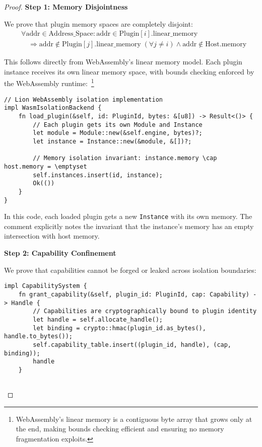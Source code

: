 \begin{proof}

\textbf{Step 1: Memory Disjointness}

We prove that plugin memory spaces are completely disjoint:
\begin{align}
&\forall \text{addr} \in \text{Address\_Space}: \text{addr} \in \text{Plugin}[i].\text{linear\_memory} \nonumber \\
&\quad \Rightarrow \text{addr} \notin \text{Plugin}[j].\text{linear\_memory} \; (\forall j \neq i) \land \text{addr} \notin \text{Host}.\text{memory}
\end{align}

This follows directly from WebAssembly's linear memory model. Each plugin instance receives its own linear memory space, with bounds checking enforced by the WebAssembly runtime:~\footnote{WebAssembly's linear memory is a contiguous byte array that grows only at the end, making bounds checking efficient and ensuring no memory fragmentation exploits.}

\begin{lstlisting}[style=rust,caption={Lion WebAssembly isolation implementation}]
// Lion WebAssembly isolation implementation
impl WasmIsolationBackend {
    fn load_plugin(&self, id: PluginId, bytes: &[u8]) -> Result<()> {
        // Each plugin gets its own Module and Instance
        let module = Module::new(&self.engine, bytes)?;
        let instance = Instance::new(&module, &[])?;
        
        // Memory isolation invariant: instance.memory \cap host.memory = \emptyset
        self.instances.insert(id, instance);
        Ok(())
    }
}
\end{lstlisting}

In this code, each loaded plugin gets a new \texttt{Instance} with its own memory. The comment explicitly notes the invariant that the instance's memory has an empty intersection with host memory.

\textbf{Step 2: Capability Confinement}

We prove that capabilities cannot be forged or leaked across isolation boundaries:

\begin{lstlisting}[style=rust,caption={Capability system implementation}]
impl CapabilitySystem {
    fn grant_capability(&self, plugin_id: PluginId, cap: Capability) -> Handle {
        // Capabilities are cryptographically bound to plugin identity
        let handle = self.allocate_handle();
        let binding = crypto::hmac(plugin_id.as_bytes(), handle.to_bytes());
        self.capability_table.insert((plugin_id, handle), (cap, binding));
        handle
    }
    

\end{lstlisting}
\end{proof}
